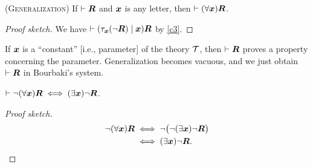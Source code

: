 \begin{dc}\label{c27}\textup{(\textsc{Generalization})}%
If $\vdash\boldsymbol{R}$ and $\boldsymbol{x}$ is any letter, then
$\vdash(\forall\boldsymbol{x})\boldsymbol{R}$.
\end{dc}

\begin{proof}[Proof sketch]
We have $\vdash(\tau_{\boldsymbol{x}}(\neg\boldsymbol{R})\mid\boldsymbol{x})\boldsymbol{R}$
by \ref{c3}.
\end{proof}

\begin{remark*}
If $\boldsymbol{x}$ is a ``constant'' [i.e., parameter] of the theory
$\mathcal{T}$, then $\vdash\boldsymbol{R}$ proves a property concerning
the parameter. Generalization becomes vacuous, and we just obtain
$\vdash\boldsymbol{R}$ in Bourbaki's system.
\end{remark*}

\begin{dc}\label{c28}%
$\vdash\neg(\forall\boldsymbol{x})\boldsymbol{R}\iff(\exists\boldsymbol{x})\neg\boldsymbol{R}$.
\end{dc}

\begin{proof}[Proof sketch]
\begin{align*}
\neg(\forall\boldsymbol{x})\boldsymbol{R} &\iff\neg\bigl(\neg(\exists\boldsymbol{x})\neg\boldsymbol{R}\bigr)\\
&\iff(\exists\boldsymbol{x})\neg\boldsymbol{R}.\qedhere
\end{align*}
\end{proof}

